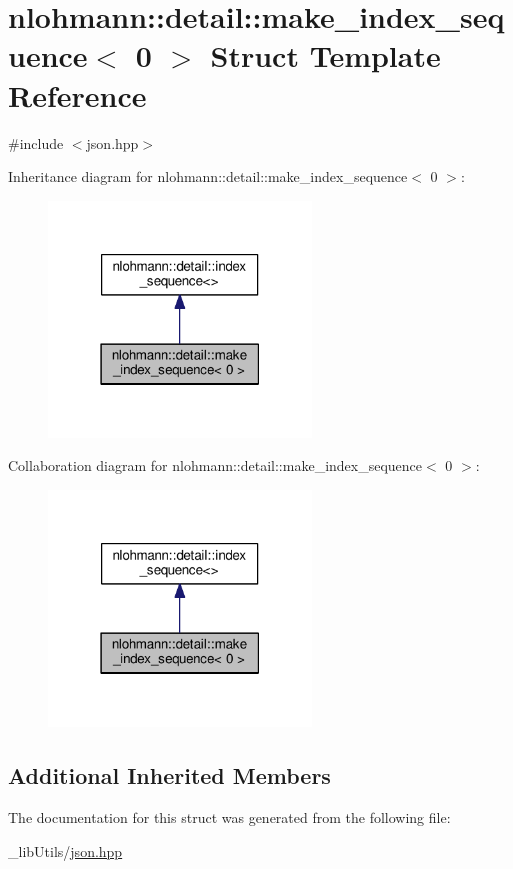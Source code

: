 \hypertarget{structnlohmann_1_1detail_1_1make__index__sequence_3_010_01_4}{}\section{nlohmann\+:\+:detail\+:\+:make\+\_\+index\+\_\+sequence$<$ 0 $>$ Struct Template Reference}
\label{structnlohmann_1_1detail_1_1make__index__sequence_3_010_01_4}


{\ttfamily \#include $<$json.\+hpp$>$}



Inheritance diagram for nlohmann\+:\+:detail\+:\+:make\+\_\+index\+\_\+sequence$<$ 0 $>$\+:\nopagebreak
\begin{figure}[H]
\begin{center}
\leavevmode
\includegraphics[width=198pt]{structnlohmann_1_1detail_1_1make__index__sequence_3_010_01_4__inherit__graph}
\end{center}
\end{figure}


Collaboration diagram for nlohmann\+:\+:detail\+:\+:make\+\_\+index\+\_\+sequence$<$ 0 $>$\+:\nopagebreak
\begin{figure}[H]
\begin{center}
\leavevmode
\includegraphics[width=198pt]{structnlohmann_1_1detail_1_1make__index__sequence_3_010_01_4__coll__graph}
\end{center}
\end{figure}
\subsection*{Additional Inherited Members}


The documentation for this struct was generated from the following file\+:\begin{DoxyCompactItemize}
\item 
\+\_\+lib\+Utils/\hyperlink{json_8hpp}{json.\+hpp}\end{DoxyCompactItemize}
